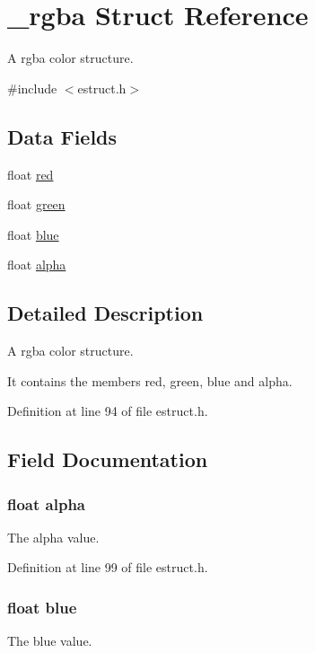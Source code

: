 \hypertarget{struct__rgba}{\section{\-\_\-rgba Struct Reference}
\label{struct__rgba}
}


A rgba color structure.  




{\ttfamily \#include $<$estruct.\-h$>$}

\subsection*{Data Fields}
\begin{DoxyCompactItemize}
\item 
float \hyperlink{struct__rgba_acddf4f34ba92c602d4205ba50e98d603}{red}
\item 
float \hyperlink{struct__rgba_af8d69af46156237d69b44a880e4f486e}{green}
\item 
float \hyperlink{struct__rgba_a322e0de27f54901aa172ae487dba2914}{blue}
\item 
float \hyperlink{struct__rgba_ab1551d8043c2aa4410fb7dbb1fe3be7b}{alpha}
\end{DoxyCompactItemize}


\subsection{Detailed Description}
A rgba color structure. 

It contains the members red, green, blue and alpha. 

Definition at line 94 of file estruct.\-h.



\subsection{Field Documentation}
\hypertarget{struct__rgba_ab1551d8043c2aa4410fb7dbb1fe3be7b}{
\subsubsection[{alpha}]{\setlength{\rightskip}{0pt plus 5cm}float alpha}}\label{struct__rgba_ab1551d8043c2aa4410fb7dbb1fe3be7b}
The alpha value. 

Definition at line 99 of file estruct.\-h.

\hypertarget{struct__rgba_a322e0de27f54901aa172ae487dba2914}{
\subsubsection[{blue}]{\setlength{\rightskip}{0pt plus 5cm}float blue}}\label{struct__rgba_a322e0de27f54901aa172ae487dba2914}
The blue value. 

